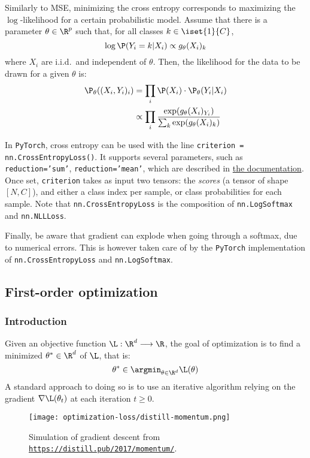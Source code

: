 Similarly to MSE, minimizing the cross entropy corresponds to maximizing the $\log$-likelihood for a certain probabilistic model. Assume that there is a parameter $\theta\in\R^p$ such that, for all classes $k\in\iset{1}{C}$,
\begin{equation*}
    \log\P(Y_i=k|X_i) \propto g_\theta(X_i)_k
\end{equation*}
where $X_i$ are i.i.d.~and independent of $\theta$. Then, the likelihood for the data to be drawn for a given $\theta$ is:
\begin{equation*}
    \begin{aligned}
        \P_\theta((X_i,Y_i)_i) &= \prod_i\P(X_i)\cdot\P_\theta(Y_i|X_i)\\
        &\propto\prod_i\frac{\exp(g_\theta(X_i)_{Y_i})}{\sum_k\exp(g_\theta(X_i)_k)}        
    \end{aligned}
\end{equation*}

In \texttt{PyTorch}, cross entropy can be used with the line \texttt{criterion = nn.CrossEntropyLoss()}. It supports several parameters, such as \texttt{reduction='sum'}, \texttt{reduction='mean'}, which are described in \href{https://pytorch.org/docs/stable/generated/torch.nn.MSELoss.html}{the documentation}. Once set, \texttt{criterion} takes as input two tensors: the \emph{scores} (a tensor of shape $[N,C]$), and either a class index per sample, or class probabilities for each sample. Note that \texttt{nn.CrossEntropyLoss} is the composition of \texttt{nn.LogSoftmax} and \texttt{nn.NLLLoss}.

Finally, be aware that gradient can explode when going through a softmax, due to numerical errors. This is however taken care of by the \texttt{PyTorch} implementation of \texttt{nn.CrossEntropyLoss} and \texttt{nn.LogSoftmax}.

\subsection{First-order optimization}
\subsubsection{Introduction}
Given an objective function $\L:\R^d\longrightarrow\R$, the goal of optimization is to find a minimized $\theta^*\in\R^d$ of $\L$, that is:
\begin{equation*}
    \theta^*\in\argmin_{\theta\in\R^d}\L(\theta)
\end{equation*}
A standard approach to doing so is to use an iterative algorithm relying on the gradient $\nabla\L(\theta_t)$ at each iteration $t\geq0$.
\begin{figure}[H]
    \centering
    \texttt{[image: optimization-loss/distill-momentum.png]}
    \caption{Simulation of gradient descent from \href{https://distill.pub/2017/momentum/}{\nolinkurl{https://distill.pub/2017/momentum/}}.}  
\end{figure}

